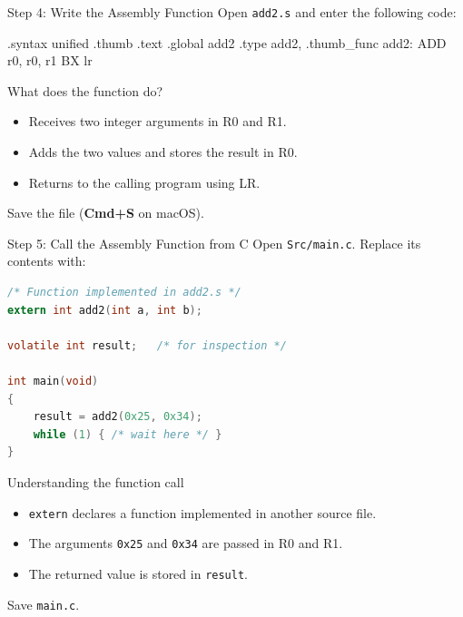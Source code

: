 \documentclass[9pt,aspectratio=169,xcolor=table]{beamer}
\begin{document}
\begin{frame}[fragile]{Step 4: Write the Assembly Function}
	\leavevmode
	{\small Open \texttt{add2.s} and enter the following code:}

	\begin{asm}[basicstyle=\footnotesize\ttfamily, morecomment={[l]{@}}]
    .syntax unified
    .thumb
    .text
    .global add2
    .type add2, %
    .thumb_func
add2:
    ADD   r0, r0, r1
    BX    lr
\end{asm}

	\vspace{1mm}
	{\small
	\begin{block}{What does the function do?}
		\begin{itemize}\itemsep0pt
			\item Receives two integer arguments in R0 and R1.
			\item Adds the two values and stores the result in R0.
			\item Returns to the calling program using LR.
		\end{itemize}
	\end{block}}

	{\small Save the file (\textbf{Cmd+S} on macOS).}
\end{frame}


\begin{frame}[fragile]{Step 5: Call the Assembly Function from C}
	\leavevmode
	{\small Open \texttt{Src/main.c}. Replace its contents with:}

	\begin{lstlisting}[language=C,basicstyle=\footnotesize\ttfamily]
/* Function implemented in add2.s */
extern int add2(int a, int b);

volatile int result;   /* for inspection */

int main(void)
{
	result = add2(0x25, 0x34);
	while (1) { /* wait here */ }
}
\end{lstlisting}

	\vspace{1mm}
	{\small
	\begin{block}{Understanding the function call}
		\begin{itemize}\itemsep0pt
			\item \texttt{extern} declares a function implemented
			in another source file.
			\item The arguments \texttt{0x25} and \texttt{0x34}
			are passed in R0 and R1.
			\item The returned value is stored in \texttt{result}.
		\end{itemize}
	\end{block}}

	Save \texttt{main.c}.
\end{frame}
\end{document}
